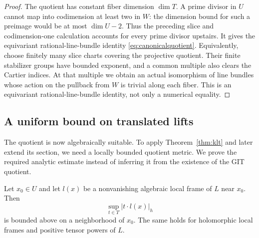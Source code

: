 \begin{proof}
The quotient has constant fiber dimension $\dim T$. A prime divisor in $U$ cannot map into codimension at least two in $W$: the dimension bound for such a preimage would be at most $\dim U-2$. Thus the preceding slice and codimension-one calculation accounts for every prime divisor upstairs. It gives the equivariant rational-line-bundle identity \eqref{eq:canonicalquotient}. Equivalently, choose finitely many slice charts covering the projective quotient. Their finite stabilizer groups have bounded exponent, and a common multiple also clears the Cartier indices. At that multiple we obtain an actual isomorphism of line bundles whose action on the pullback from $W$ is trivial along each fiber. This is an equivariant rational-line-bundle identity, not only a numerical equality.
\end{proof}

\subsection{A uniform bound on translated lifts}\label{subsec:orbitbound}

The quotient is now algebraically suitable. To apply Theorem~\ref{thm:klt} and later extend its section, we need a locally bounded quotient metric. We prove the required analytic estimate instead of inferring it from the existence of the GIT quotient.

\begin{lemma}\label{lem:orbitbound}
Let $x_0\in U$ and let $l(x)$ be a nonvanishing algebraic local frame of $L$ near $x_0$. Then
\begin{equation}\label{eq:orbitbound}
\sup_{t\in T}|t\cdot l(x)|_h
\end{equation}
is bounded above on a neighborhood of $x_0$. The same holds for holomorphic local frames and positive tensor powers of $L$.
\end{lemma}

